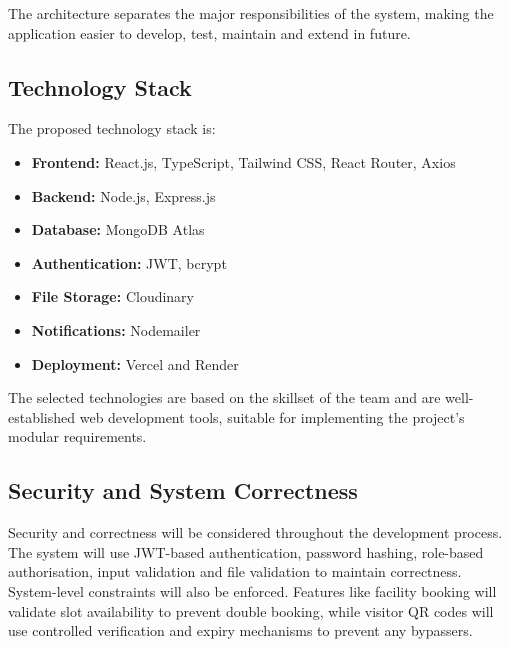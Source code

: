 \documentclass[11pt,a4paper]{article}
\begin{document}
The architecture separates the major responsibilities of the system, making the application easier to develop, test, maintain and extend in future.

\subsection{Technology Stack}

The proposed technology stack is:

\begin{itemize}

    \item \textbf{Frontend:} React.js, TypeScript, Tailwind CSS, React Router, Axios

    \item \textbf{Backend:} Node.js, Express.js

    \item \textbf{Database:} MongoDB Atlas

    \item \textbf{Authentication:} JWT, bcrypt

    \item \textbf{File Storage:} Cloudinary

    \item \textbf{Notifications:} Nodemailer

    \item \textbf{Deployment:} Vercel and Render

\end{itemize}

The selected technologies are based on the skillset of the team and are well-established web development tools, suitable for implementing the project's modular requirements.

\subsection{Security and System Correctness}

Security and correctness will be considered throughout the development process. The system will use JWT-based authentication, password hashing, role-based authorisation, input validation and file validation to maintain correctness. System-level constraints will also be enforced. Features like facility booking will validate slot availability to prevent double booking, while visitor QR codes will use controlled verification and expiry mechanisms to prevent any bypassers.

\end{document}
